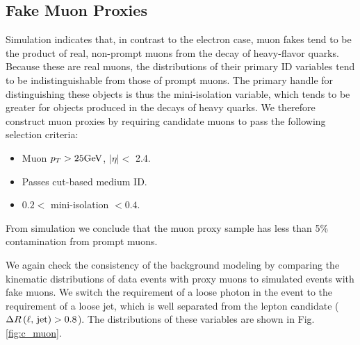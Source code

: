 \documentclass[thesis.tex]{subfiles}
\renewcommand\_{\textunderscore\allowbreak}
\begin{document}
\subsection{Fake Muon Proxies}

Simulation indicates that, in contrast to the electron case, muon fakes tend to
be the product of real, non-prompt muons from the decay of heavy-flavor quarks.
Because these are real muons, the distributions of their primary ID variables
tend to be indistinguishable from those of prompt muons. The primary handle for
distinguishing these objects is thus the mini-isolation variable, which tends
to be greater for objects produced in the decays of heavy quarks. We therefore
construct muon proxies by requiring candidate muons to pass the following
selection criteria:
\begin{itemize}
    \item Muon $p_T > 25\text{GeV}$, $|\eta| <$ 2.4.
    \item Passes cut-based medium ID.
    \item $0.2 <$ mini-isolation $< 0.4$.
\end{itemize}
From simulation we conclude that the muon proxy sample has less than 5\%
contamination from prompt muons.

We again check the consistency of the background modeling by comparing the
kinematic distributions of data events with proxy muons to simulated events
with fake muons. We switch the requirement of a loose photon in the event
to the requirement of a loose jet, which is well separated from the lepton candidate
($\Delta R\left(\textrm{\ensuremath{\ell}, jet}\right) > 0.8$). The distributions of these
variables are shown in Fig. \ref{fig:c_muon}. 
\end{document}
